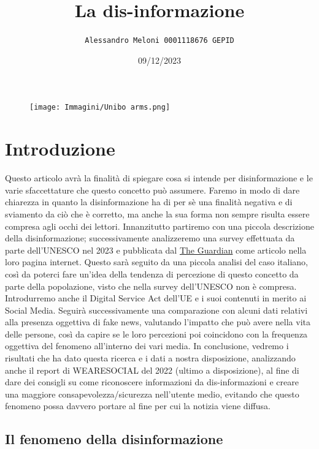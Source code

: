 \documentclass{article}
\title{\Huge\textbf{La dis-informazione}}
\author{\texttt{Alessandro Meloni 0001118676 GEPID}}
\date{09/12/2023}
\begin{document}
\begin{figure}
    \centering
    \texttt{[image: Immagini/Unibo arms.png]}
\end{figure}
    \maketitle
\centering\tableofcontents
\newpage \section{Introduzione}
\flushleft
\begin{justify}
    Questo articolo avrà la finalità di spiegare cosa si intende per disinformazione e le varie sfaccettature che questo concetto può assumere.
    Faremo in modo di dare chiarezza in quanto la disinformazione ha di per sè una finalità negativa e di sviamento da ciò che è corretto, ma anche la sua forma non sempre risulta essere compresa agli occhi dei lettori.
    Innanzitutto partiremo con una piccola descrizione della disinformazione; successivamente analizzeremo una survey effettuata da parte dell'UNESCO nel 2023 e pubblicata dal \href{https://www.theguardian.com/technology/2023/nov/07/85-of-people-worry-about-online-disinformation-global-survey-finds}{The Guardian}\label{:articolo} come articolo nella loro pagina internet. Questo sarà seguito da una piccola analisi del caso italiano, così da poterci fare un'idea della tendenza di percezione di questo concetto da parte della popolazione, visto che nella survey dell'UNESCO non è compresa.
    Introdurremo anche il Digital Service Act dell'UE e i suoi contenuti in merito ai Social Media.
    Seguirà successivamente una comparazione con alcuni dati relativi alla presenza oggettiva di fake news, valutando l'impatto che può avere nella vita delle persone, così da capire se le loro percezioni poi coincidono con la frequenza oggettiva del fenomeno all'interno dei vari media.
    In conclusione, vedremo i risultati che ha dato questa ricerca e i dati a nostra disposizione, analizzando anche il report di WEARESOCIAL del 2022 (ultimo a disposizione), al fine di dare dei consigli su come riconoscere informazioni da dis-informazioni e creare una maggiore consapevolezza/sicurezza nell'utente medio, evitando che questo fenomeno possa davvero portare al fine per cui la notizia viene diffusa.
\end{justify}

\begin{center}
\section{Il fenomeno della disinformazione}
\end{center}
\end{document}
